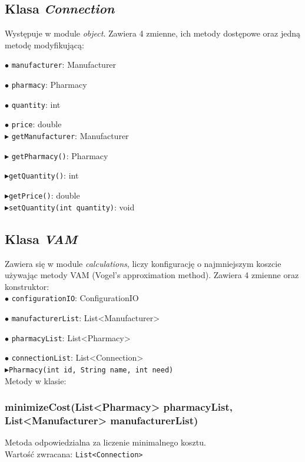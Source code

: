 \documentclass[]{article}
\begin{document}
    \subsection{Klasa \textit{Connection}}
    Występuje w module \textit{object}.
    Zawiera 4 zmienne, ich metody dostępowe oraz jedną metodę modyfikującą:

    $\bullet$ \verb|manufacturer|: Manufacturer

    $\bullet$ \verb|pharmacy|: Pharmacy

    $\bullet$ \verb|quantity|: int

    $\bullet$ \verb|price|: double\\

    $ \blacktriangleright $ \verb|getManufacturer|: Manufacturer

    $ \blacktriangleright $ \verb|getPharmacy()|: Pharmacy

    $ \blacktriangleright $\verb|getQuantity()|: int

    $ \blacktriangleright $\verb|getPrice()|: double\\

    $ \blacktriangleright $\verb|setQuantity(int quantity)|: void\\

    \subsection{Klasa \textit{VAM}}
    Zawiera się w module \textit{calculations}, liczy konfigurację o najmniejszym koszcie używając metody VAM (Vogel's approximation method).
    Zawiera 4 zmienne oraz konstruktor:\\

    $\bullet$ \verb|configurationIO|: ConfigurationIO

    $\bullet$ \verb|manufacturerList|: List<Manufacturer>

    $\bullet$ \verb|pharmacyList|: List<Pharmacy>

    $\bullet$ \verb|connectionList|: List<Connection>\\

    $ \blacktriangleright $\verb|Pharmacy(int id, String name, int need)|\\


    Metody w klasie:

    \subsubsection{minimizeCost(List<Pharmacy> pharmacyList, List<Manufacturer> manufacturerList)}
    Metoda odpowiedzialna za liczenie minimalnego kosztu.\\
    Wartość zwracana: \verb|List<Connection>|
\end{document}
